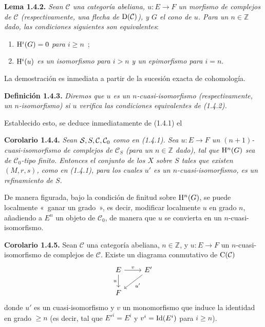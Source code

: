 \textbf{Lema 1.4.2.} \emph{Sean \(\mathcal C\) una categoría abeliana, \(u:E\to F\) un morfismo de complejos de \(\mathcal C\) (respectivamente, una flecha de \(\Dpx(\mathcal C)\)), y \(G\) el cono de \(u\). Para un \(n\in\mathbb Z\) dado, las condiciones siguientes son equivalentes}:
\begin{enumerate}[label=(\roman*)]
\item \emph{\(\Ho^i(G)=0\) para \(i\geq n\)}~;
\item \emph{\(\Ho^i(u)\) es un isomorfismo para \(i>n\) y un epimorfismo para \(i=n\)}.
\end{enumerate}
La demostración es inmediata a partir de la sucesión exacta de cohomología.

\textbf{Definición 1.4.3.} \emph{Diremos que \(u\) es un \(n\)-cuasi-isomorfismo (respectivamente, un \(n\)-isomorfismo) si \(u\) verifica las condiciones equivalentes de (1.4.2).}

Establecido esto, se deduce inmediatamente de (1.4.1) el

\textbf{Corolario 1.4.4.} \emph{Sean \(\sisi{S}{\mathcal S},S,\mathcal C,\mathcal C_0\) como en (1.4.1). Sea \(u:E\to F\) un \((n+1)\)-cuasi-isomorfismo de complejos de \(\mathcal C_S\) (para un \(n\in\mathbb Z\) dado), tal que \(\Ho^n(G)\) sea de \(\mathcal C_0\)-tipo finito. Entonces el conjunto de los \(X\) sobre \(S\) tales que existen \((M,r,s)\), como en (1.4.1), para los cuales \(u'\) es un \(n\)-cuasi-isomorfismo, es un refinamiento de \(S\).}

De manera figurada, bajo la condición de finitud sobre \(\Ho^n(G)\), se puede localmente «~ganar un grado~», es decir, modificar localmente \(u\) en grado \(n\), añadiendo a \(E^n\) un objeto de \(\mathcal C_0\), de manera que \(u\) se convierta en un \(n\)-cuasi-isomorfismo.

\textbf{Corolario 1.4.5.} Sean \(\mathcal C\) una categoría abeliana, \(n\in\mathbb Z\), y \(u:E\to F\) un \(n\)-cuasi-isomorfismo de complejos de \(\mathcal C\). Existe un diagrama conmutativo de \(\Cpx(\mathcal C)\)
\[
\begin{tikzcd}
E \arrow[r,"v"] \arrow[d,"u"'] & E' \arrow[dl,"u'"]\\
F &
\end{tikzcd}
\]
donde \(u'\) es un cuasi-isomorfismo y \(v\) un monomorfismo que induce la identidad en grado \(\geq n\) (es decir, tal que \(E'^i=E^i\) y \(v^i=\id(E^i)\) para \(i\geq n\)).

